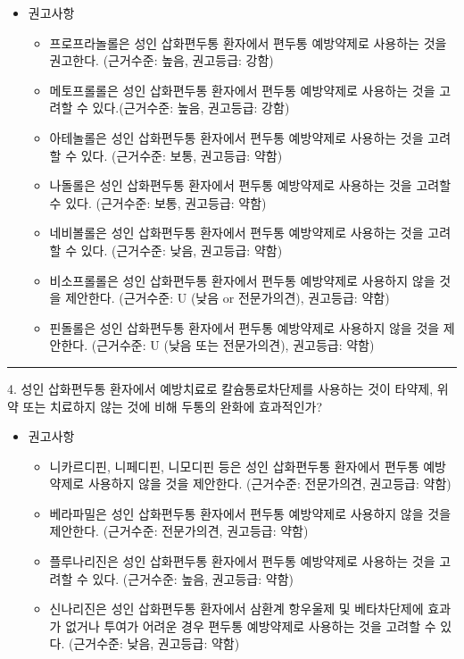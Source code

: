 \documentclass[]{book}
\providecommand{\tightlist}{%
  \setlength{\itemsep}{0pt}\setlength{\parskip}{0pt}}
\begin{document}
\begin{itemize}
\item
  권고사항

  \begin{itemize}
  \tightlist
  \item
    프로프라놀롤은 성인 삽화편두통 환자에서 편두통 예방약제로 사용하는 것을 권고한다. (근거수준: 높음, 권고등급: 강함)
  \item
    메토프롤롤은 성인 삽화편두통 환자에서 편두통 예방약제로 사용하는 것을 고려할 수 있다.(근거수준: 높음, 권고등급: 강함)
  \item
    아테놀롤은 성인 삽화편두통 환자에서 편두통 예방약제로 사용하는 것을 고려할 수 있다. (근거수준: 보통, 권고등급: 약함)
  \item
    나돌롤은 성인 삽화편두통 환자에서 편두통 예방약제로 사용하는 것을 고려할 수 있다. (근거수준: 보통, 권고등급: 약함)
  \item
    네비볼롤은 성인 삽화편두통 환자에서 편두통 예방약제로 사용하는 것을 고려할 수 있다. (근거수준: 낮음, 권고등급: 약함)
  \item
    비소프롤롤은 성인 삽화편두통 환자에서 편두통 예방약제로 사용하지 않을 것을 제안한다. (근거수준: U (낮음 or 전문가의견), 권고등급: 약함)
  \item
    핀돌롤은 성인 삽화편두통 환자에서 편두통 예방약제로 사용하지 않을 것을 제안한다. (근거수준: U (낮음 또는 전문가의견), 권고등급: 약함)
  \end{itemize}
\end{itemize}

\begin{center}\rule{0.5\linewidth}{\linethickness}\end{center}

4. 성인 삽화편두통 환자에서 예방치료로 칼슘통로차단제를 사용하는 것이 타약제, 위약 또는 치료하지 않는 것에 비해 두통의 완화에 효과적인가?

\begin{itemize}
\item
  권고사항

  \begin{itemize}
  \tightlist
  \item
    니카르디핀, 니페디핀, 니모디핀 등은 성인 삽화편두통 환자에서 편두통 예방약제로 사용하지 않을 것을 제안한다. (근거수준: 전문가의견, 권고등급: 약함)
  \item
    베라파밀은 성인 삽화편두통 환자에서 편두통 예방약제로 사용하지 않을 것을 제안한다. (근거수준: 전문가의견, 권고등급: 약함)
  \item
    플루나리진은 성인 삽화편두통 환자에서 편두통 예방약제로 사용하는 것을 고려할 수 있다. (근거수준: 높음, 권고등급: 약함)
  \item
    신나리진은 성인 삽화편두통 환자에서 삼환계 항우울제 및 베타차단제에 효과가 없거나 투여가 어려운 경우 편두통 예방약제로 사용하는 것을 고려할 수 있다. (근거수준: 낮음, 권고등급: 약함)
  \end{itemize}
\end{itemize}
\end{document}
